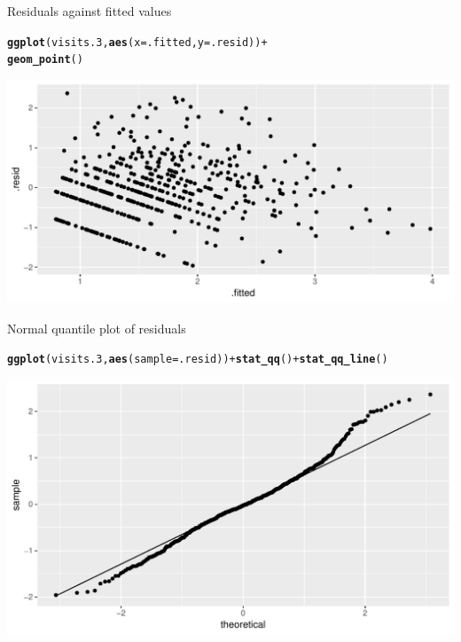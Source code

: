 \documentclass[unknownkeysallowed]{beamer}\usepackage[]{graphicx}\usepackage[]{color}
\makeatletter
\def\maxwidth{ %
  \ifdim\Gin@nat@width>\linewidth
    \linewidth
  \else
    \Gin@nat@width
  \fi
}
\newcommand{\hlopt}[1]{\textcolor[rgb]{0,0,0}{#1}}%
\newcommand{\hlstd}[1]{\textcolor[rgb]{0.345,0.345,0.345}{#1}}%
\newcommand{\hlkwc}[1]{\textcolor[rgb]{0.333,0.667,0.333}{#1}}%
\newcommand{\hlkwd}[1]{\textcolor[rgb]{0.737,0.353,0.396}{\textbf{#1}}}%
\newenvironment{kframe}{%
 \def\at@end@of@kframe{}%
 \ifinner\ifhmode%
  \def\at@end@of@kframe{\end{minipage}}%
  \begin{minipage}{\columnwidth}%
 \fi\fi%
 \def\FrameCommand##1{\hskip\@totalleftmargin \hskip-\fboxsep
 \colorbox{shadecolor}{##1}\hskip-\fboxsep
     \hskip-\linewidth \hskip-\@totalleftmargin \hskip\columnwidth}%
 \MakeFramed {\advance\hsize-\width
   \@totalleftmargin\z@ \linewidth\hsize
   \@setminipage}}%
 {\par\unskip\endMakeFramed%
 \at@end@of@kframe}
\newenvironment{knitrout}{}{} %
\makeatother
\begin{document}
\begin{frame}[fragile]{Residuals against fitted values}
  
\begin{knitrout}
\color{fgcolor}\begin{kframe}
\begin{alltt}
\hlkwd{ggplot}\hlstd{(visits.3,}\hlkwd{aes}\hlstd{(}\hlkwc{x}\hlstd{=.fitted,}\hlkwc{y}\hlstd{=.resid))}\hlopt{+}
  \hlkwd{geom_point}\hlstd{()}
\end{alltt}
\end{kframe}
\includegraphics[width=\maxwidth]{figure/unnamed-chunk-33-1} 

\end{knitrout}
\end{frame}

\begin{frame}[fragile]{Normal quantile plot of residuals}
  
\begin{knitrout}
\color{fgcolor}\begin{kframe}
\begin{alltt}
\hlkwd{ggplot}\hlstd{(visits.3,} \hlkwd{aes}\hlstd{(}\hlkwc{sample}\hlstd{=.resid))}\hlopt{+}\hlkwd{stat_qq}\hlstd{()}\hlopt{+}\hlkwd{stat_qq_line}\hlstd{()}
\end{alltt}
\end{kframe}
\includegraphics[width=\maxwidth]{figure/unnamed-chunk-34-1} 

\end{knitrout}
  
\end{frame}
\end{document}
